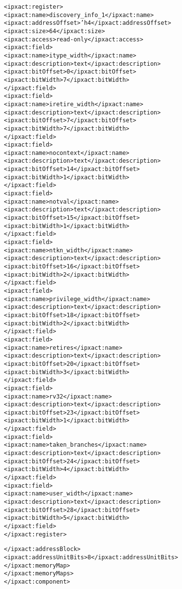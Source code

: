 \begin{alltt}
            <ipxact:register>
               <ipxact:name>discovery_info_1</ipxact:name>
               <ipxact:addressOffset>'h4</ipxact:addressOffset>
               <ipxact:size>64</ipxact:size>
               <ipxact:access>read-only</ipxact:access>
               <ipxact:field>
                  <ipxact:name>itype_width</ipxact:name>
                  <ipxact:description>text</ipxact:description>
                  <ipxact:bitOffset>0</ipxact:bitOffset>
                  <ipxact:bitWidth>7</ipxact:bitWidth>
               </ipxact:field>
               <ipxact:field>
                  <ipxact:name>iretire_width</ipxact:name>
                  <ipxact:description>text</ipxact:description>
                  <ipxact:bitOffset>7</ipxact:bitOffset>
                  <ipxact:bitWidth>7</ipxact:bitWidth>
               </ipxact:field>
               <ipxact:field>
                  <ipxact:name>nocontext</ipxact:name>
                  <ipxact:description>text</ipxact:description>
                  <ipxact:bitOffset>14</ipxact:bitOffset>
                  <ipxact:bitWidth>1</ipxact:bitWidth>
               </ipxact:field>
               <ipxact:field>
                  <ipxact:name>notval</ipxact:name>
                  <ipxact:description>text</ipxact:description>
                  <ipxact:bitOffset>15</ipxact:bitOffset>
                  <ipxact:bitWidth>1</ipxact:bitWidth>
               </ipxact:field>
               <ipxact:field>
                  <ipxact:name>ntkn_width</ipxact:name>
                  <ipxact:description>text</ipxact:description>
                  <ipxact:bitOffset>16</ipxact:bitOffset>
                  <ipxact:bitWidth>2</ipxact:bitWidth>
               </ipxact:field>
               <ipxact:field>
                  <ipxact:name>privilege_width</ipxact:name>
                  <ipxact:description>text</ipxact:description>
                  <ipxact:bitOffset>18</ipxact:bitOffset>
                  <ipxact:bitWidth>2</ipxact:bitWidth>
               </ipxact:field>
               <ipxact:field>
                  <ipxact:name>retires</ipxact:name>
                  <ipxact:description>text</ipxact:description>
                  <ipxact:bitOffset>20</ipxact:bitOffset>
                  <ipxact:bitWidth>3</ipxact:bitWidth>
               </ipxact:field>
               <ipxact:field>
                  <ipxact:name>rv32</ipxact:name>
                  <ipxact:description>text</ipxact:description>
                  <ipxact:bitOffset>23</ipxact:bitOffset>
                  <ipxact:bitWidth>1</ipxact:bitWidth>
               </ipxact:field>
               <ipxact:field>
                  <ipxact:name>taken_branches</ipxact:name>
                  <ipxact:description>text</ipxact:description>
                  <ipxact:bitOffset>24</ipxact:bitOffset>
                  <ipxact:bitWidth>4</ipxact:bitWidth>
               </ipxact:field>
               <ipxact:field>
                  <ipxact:name>user_width</ipxact:name>
                  <ipxact:description>text</ipxact:description>
                  <ipxact:bitOffset>28</ipxact:bitOffset>
                  <ipxact:bitWidth>5</ipxact:bitWidth>
               </ipxact:field>
            </ipxact:register>

         </ipxact:addressBlock>
         <ipxact:addressUnitBits>8</ipxact:addressUnitBits>
      </ipxact:memoryMap>
   </ipxact:memoryMaps>
</ipxact:component>

\end{alltt}
